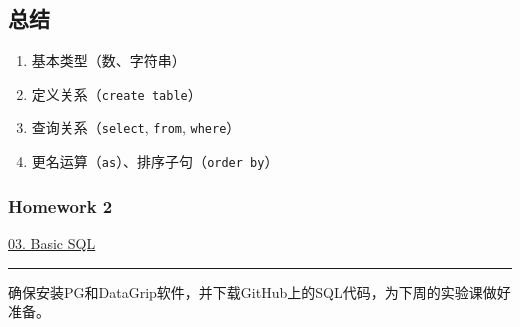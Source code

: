 \documentclass[aspectratio=169, 14pt]{beamer}
\begin{document}
\begin{frame}
	\section{\textcolor{darkmidnightblue}{总结}}
	\begin{enumerate}
		\item 基本类型（数、字符串）
		\item 定义关系（\texttt{create table}）
		\item 查询关系（\texttt{select}, \texttt{from}, \texttt{where}）
		\item 更名运算（\texttt{as}）、排序子句（\texttt{order by}）
	\end{enumerate}
\end{frame}
\begin{frame}
	\frametitle{Homework 2}
	\href{https://github.com/ChenZhongPu/db-swufe/tree/master/03_basic_sql}{03. Basic SQL}

	\noindent\rule{\textwidth}{1pt}

	确保安装PG和DataGrip软件，并下载GitHub上的SQL代码，为下周的实验课做好准备。

\end{frame}
\end{document}
